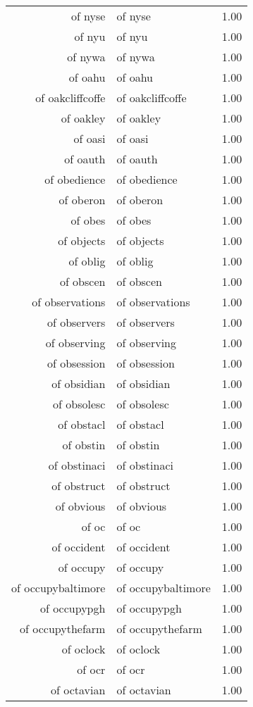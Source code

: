 \begin{table}[ht]
\begin{tabular}{rlr}
  of nyse & of nyse & 1.00 \\ 
  of nyu & of nyu & 1.00 \\ 
  of nywa & of nywa & 1.00 \\ 
  of oahu & of oahu & 1.00 \\ 
  of oakcliffcoffe & of oakcliffcoffe & 1.00 \\ 
  of oakley & of oakley & 1.00 \\ 
  of oasi & of oasi & 1.00 \\ 
  of oauth & of oauth & 1.00 \\ 
  of obedience & of obedience & 1.00 \\ 
  of oberon & of oberon & 1.00 \\ 
  of obes & of obes & 1.00 \\ 
  of objects & of objects & 1.00 \\ 
  of oblig & of oblig & 1.00 \\ 
  of obscen & of obscen & 1.00 \\ 
  of observations & of observations & 1.00 \\ 
  of observers & of observers & 1.00 \\ 
  of observing & of observing & 1.00 \\ 
  of obsession & of obsession & 1.00 \\ 
  of obsidian & of obsidian & 1.00 \\ 
  of obsolesc & of obsolesc & 1.00 \\ 
  of obstacl & of obstacl & 1.00 \\ 
  of obstin & of obstin & 1.00 \\ 
  of obstinaci & of obstinaci & 1.00 \\ 
  of obstruct & of obstruct & 1.00 \\ 
  of obvious & of obvious & 1.00 \\ 
  of oc & of oc & 1.00 \\ 
  of occident & of occident & 1.00 \\ 
  of occupy & of occupy & 1.00 \\ 
  of occupybaltimore & of occupybaltimore & 1.00 \\ 
  of occupypgh & of occupypgh & 1.00 \\ 
  of occupythefarm & of occupythefarm & 1.00 \\ 
  of oclock & of oclock & 1.00 \\ 
  of ocr & of ocr & 1.00 \\ 
  of octavian & of octavian & 1.00 \\ 

\end{tabular}
\end{table}
